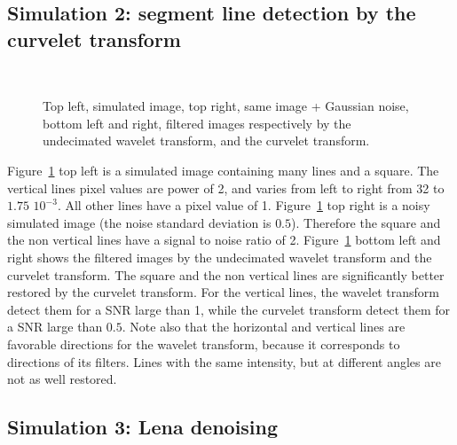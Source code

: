 \documentclass[11pt,a4paper]{article}
\begin{document}
\subsection{Simulation 2: segment line detection by the curvelet transform}
\begin{figure}[htb]
\centerline{
\vbox{
\hbox{
}
\hbox{
}}}
\caption{Top left, simulated image, top right, same image + Gaussian noise,
bottom left and right, filtered images respectively 
by the undecimated wavelet
transform, and the curvelet transform.}
\label{fig_cur_line}
\end{figure}
Figure~\ref{fig_cur_line} top left is a simulated image containing many lines
and a square. The vertical lines pixel values are power of 2, and
varies from left to right from 32 to $1.75$ $10^{-3}$. All other lines have 
a pixel value of 1. Figure~\ref{fig_cur_line} top right is a noisy 
simulated image (the noise standard deviation is $0.5$). Therefore the
square and the non vertical lines have a signal to noise ratio of 2.
Figure~\ref{fig_cur_line} bottom left and right shows the filtered images
by the undecimated wavelet transform and the curvelet transform.
The square and the non vertical lines are significantly better restored by
the curvelet transform. For the vertical lines, the wavelet transform detect
them for a SNR large than 1, while the curvelet transform detect them  
for a SNR large than $0.5$. Note also that  the horizontal and vertical 
lines are favorable directions for the wavelet transform, because it corresponds
to directions of its filters. Lines with the same intensity, but at different 
angles are not as well restored.



\subsection{Simulation 3: Lena denoising}
\end{document}
